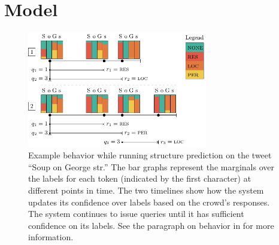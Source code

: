 \section{Model}
\label{sec:otj:model}

\begin{figure}
  \centering
  \includegraphics[width=0.7\textwidth]{figures/behavior.pdf}
  \caption[Incorporating information from responses.]{\label{fig:otj:behavior}
  Example behavior while running structure prediction on the tweet ``Soup on George str.''
  The bar graphs represent the marginals over the labels for each token (indicated by the first character) at different points in time. 
  The two timelines show how the system updates its confidence over labels based on the crowd's responses.
  The system continues to issue queries until it has sufficient confidence on its labels. 
  See the paragraph on behavior in  for more information.
  }
\end{figure}

